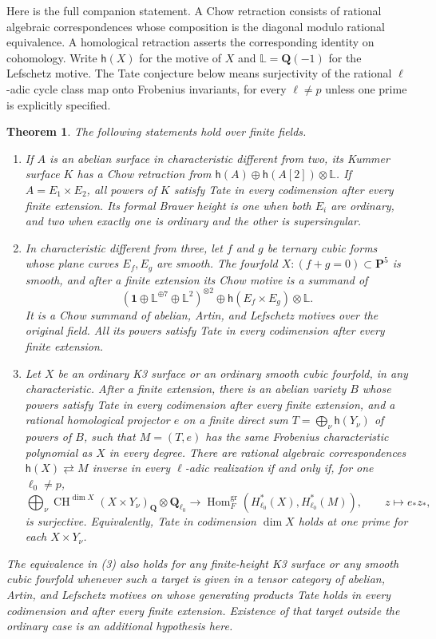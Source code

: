 \documentclass[11pt,a4paper]{article}
\newcommand{\Q}{\mathbf Q}
\newtheorem{theorem}{Theorem}[section]
\theoremstyle{definition}
\theoremstyle{remark}
\begin{document}
Here is the full companion statement. A Chow retraction consists
of rational algebraic correspondences whose composition is the
diagonal modulo rational equivalence. A homological retraction
asserts the corresponding identity on cohomology. Write
$\mathsf h(X)$ for the motive of $X$ and
$\mathbb L=\Q(-1)$ for the Lefschetz motive. The Tate conjecture
below means surjectivity of the rational $\ell$-adic cycle class
map onto Frobenius invariants, for every $\ell\ne p$ unless one
prime is explicitly specified.

\begin{theorem}\label{thm:companion-main}
The following statements hold over finite fields.
\begin{enumerate}
\item If $A$ is an abelian surface in characteristic different from
two, its Kummer surface $K$ has a Chow retraction from
$\mathsf h(A)\oplus\mathsf h(A[2])\otimes\mathbb L$.
If $A=E_1\times E_2$, all powers of $K$ satisfy Tate in every
codimension after every finite extension. Its formal Brauer height
is one when both $E_i$ are ordinary, and two when exactly one is
ordinary and the other is supersingular.
\item In characteristic different from three, let $f$ and $g$ be
ternary cubic forms whose plane curves $E_f,E_g$ are smooth.
The fourfold $X:(f+g=0)\subset\mathbf P^5$ is smooth, and after
a finite extension its Chow motive is a summand of
\[
 (\mathbf1\oplus\mathbb L^{\oplus7}\oplus\mathbb L^2)^{\otimes2}
       \oplus\mathsf h(E_f\times E_g)\otimes\mathbb L.
\]
It is a Chow summand of abelian, Artin, and Lefschetz motives over
the original field. All its powers satisfy Tate in every
codimension after every finite extension.
\item Let $X$ be an ordinary K3 surface or an ordinary smooth
cubic fourfold, in any characteristic. After a finite extension,
there is an abelian variety $B$ whose powers satisfy Tate in every
codimension after every finite extension, and a rational
homological projector $e$ on a finite direct sum
$T=\bigoplus_\nu\mathsf h(Y_\nu)$ of powers of $B$, such that
$M=(T,e)$ has the same Frobenius characteristic polynomial as
$X$ in every degree. There are rational algebraic correspondences
$\mathsf h(X)\rightleftarrows M$ inverse in every
$\ell$-adic realization if and only if, for one $\ell_0\ne p$,
\[
 \bigoplus_\nu\operatorname{CH}^{\dim X}(X\times Y_\nu)_\Q
            \otimes\Q_{\ell_0}
 \longrightarrow
 \operatorname{Hom}_{F}^{\mathrm{gr}}
       (H^*_{\ell_0}(X),H^*_{\ell_0}(M)),\qquad z\longmapsto e_*z_*,
\]
is surjective. Equivalently, Tate in codimension $\dim X$ holds
at one prime for each $X\times Y_\nu$.
\end{enumerate}
The equivalence in (3) also holds for any finite-height K3 surface
or any smooth cubic fourfold whenever such a target is given in a
tensor category of abelian, Artin, and Lefschetz motives on whose
generating products Tate holds in every codimension and after every
finite extension. Existence of that target outside the ordinary
case is an additional hypothesis here.
\end{theorem}
\end{document}
